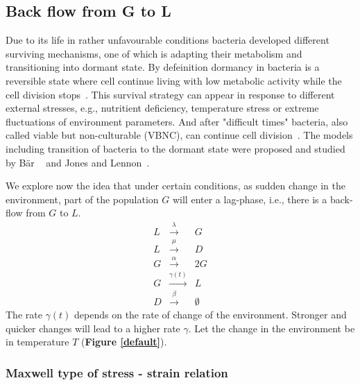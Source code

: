 \documentclass[10pt,A4paper]{article}
\begin{document}

\subsection{Back flow from G to L}

Due to its life in rather unfavourable conditions bacteria developed different surviving mechanisms, one of which is adapting their metabolism and transitioning into dormant state.
By defeinition dormancy in bacteria is a reversible state where cell continue living with low metabolic activity while the cell division stops~\cite{kaprelyants_dormancy_1993}. 
This survival strategy can appear in response to different external stresses, e.g., nutritient deficiency, temperature stress or extreme fluctuations of environment parameters.
And after "difficult times" bacteria, also called viable but non-culturable (VBNC), can continue cell division~\cite{kell_viability_1998}.
The models including transition of bacteria to the dormant state were proposed and studied by Bär \etal~\cite{bar_modelling_2002} and Jones and Lennon~\cite{jones_dormancy_2010}.



We explore now the idea that under certain conditions, as sudden change in the environment, part of the population $G$ will enter a lag-phase, i.e., there is a back-flow from $G$ to $L$. 
\begin{eqnarray}
L &\stackrel{\lambda}{\longrightarrow} & G\\
L &\stackrel{\mu}{\longrightarrow} & D\\
G &\stackrel{\alpha}{\longrightarrow} & 2G\\
G &\stackrel{\gamma(t)}{\longrightarrow} & L\\
D &\stackrel{\beta}{\longrightarrow} & \emptyset
\end{eqnarray}
The rate $\gamma(t)$ depends on the rate of change of the environment. Stronger and quicker changes will lead to a higher rate $\gamma$. 
Let the change in the environment be in temperature $T$ (\textbf{Figure \ref{default}}).

\subsubsection{Maxwell type of stress - strain relation}
\end{document}
